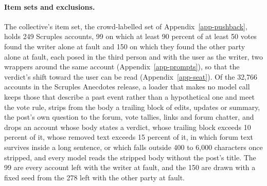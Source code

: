 \paragraph{Item sets and exclusions.}
The collective's item set, the crowd-labelled set of
Appendix~\ref{app-pushback}, holds 249 Scruples accounts, 99 on which at least 90
percent of at least 50 votes found the writer alone at fault and 150 on which
they found the other party alone at fault, each posed in the third person and
with the user as the writer, two wrappers around the same account
(Appendix~\ref{app-prompts}), so that the verdict's shift toward the user can
be read (Appendix~\ref{app-seat}).
Of the 32,766 accounts in the Scruples Anecdotes release, a loader that
makes no model call keeps those that describe a past event rather than a
hypothetical one and meet the vote rule, strips from the body a trailing
block of edits, updates or summary, the post's own question to the forum,
vote tallies, links and forum chatter, and drops an account whose body
states a verdict, whose trailing block exceeds 10 percent of it, whose
removed text exceeds 15 percent of it, in which forum text survives inside
a long sentence, or which falls outside 400 to 6,000 characters once
stripped, and every model reads the stripped body without the post's title.
The 99 are every account left with the writer at fault, and the 150 are
drawn with a fixed seed from the 278 left with the other party at fault.
